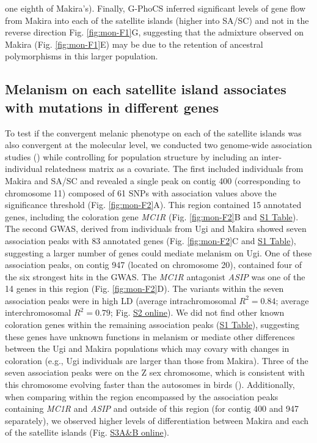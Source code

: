 one eighth of Makira’s). Finally, G-PhoCS inferred significant levels of gene flow from Makira into each of the satellite islands (higher into \ac{SA/SC}) and not in the reverse direction Fig. \ref{fig:mon-F1}G, suggesting that the admixture observed on Makira (Fig. \ref{fig:mon-F1}E) may be due to the retention of ancestral polymorphisms in this larger population.

\subsection{Melanism on each satellite island associates with mutations in different genes}
To test if the convergent melanic phenotype on each of the satellite islands was also convergent at the molecular level, we conducted two genome-wide association studies () while controlling for population structure by including an inter-individual relatedness matrix as a covariate. The first included individuals from Makira and \ac{SA/SC} and revealed a single peak on contig 400 (corresponding to chromosome 11) composed of 61 \acsp{SNP} with association values above the significance threshold (Fig. \ref{fig:mon-F2}A). This region contained 15 annotated genes, including the coloration gene \textit{MC1R} (Fig. \ref{fig:mon-F2}B and \href{https://journals.plos.org/PLOSGENETICS/article?id=10.1371/journal.pgen.1010474#sec017}{S1 Table}). The second \acs{GWAS}, derived from individuals from Ugi and Makira showed seven association peaks with 83 annotated genes (Fig. \ref{fig:mon-F2}C and \href{https://journals.plos.org/PLOSGENETICS/article?id=10.1371/journal.pgen.1010474#sec017}{S1 Table}), suggesting a larger number of genes could mediate melanism on Ugi. One of these association peaks, on contig 947 (located on chromosome 20), contained four of the six strongest hits in the \acs{GWAS}. The \textit{MC1R} antagonist \textit{ASIP} was one of the 14 genes in this region (Fig. \ref{fig:mon-F2}D). The variants within the seven association peaks were in high \ac{LD} (average intrachromosomal $R^2 = 0.84$; average interchromosomal $R^2 = 0.79$; Fig. \href{https://journals.plos.org/PLOSGENETICS/article?id=10.1371/journal.pgen.1010474#sec017}{S2 online}). We did not find other known coloration genes within the remaining association peaks (\href{https://journals.plos.org/PLOSGENETICS/article?id=10.1371/journal.pgen.1010474#sec017}{S1 Table}), suggesting these genes have unknown functions in melanism or mediate other differences between the Ugi and Makira populations which may covary with changes in coloration (e.g., Ugi individuals are larger than those from Makira). Three of the seven association peaks were on the Z sex chromosome, which is consistent with this chromosome evolving faster than the autosomes in birds (\cite{irwin2018sex}). Additionally, when comparing within the region encompassed by the association peaks containing \textit{MC1R} and \textit{ASIP} and outside of this region (for contig 400 and 947 separately), we observed higher levels of differentiation between Makira and each of the satellite islands (Fig. \href{https://journals.plos.org/PLOSGENETICS/article?id=10.1371/journal.pgen.1010474#sec017}{S3A\&B online}).

